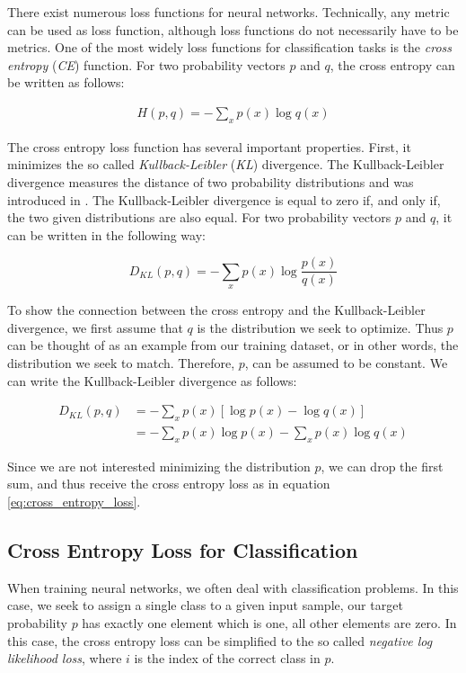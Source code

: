 There exist numerous loss functions for neural networks. Technically, any metric can be used as loss function, although loss functions do not necessarily have to be metrics. One of the most widely loss functions for classification tasks is the \textit{cross entropy} (\textit{CE}) function. For two  probability vectors $p$ and $q$, the cross entropy can be written as follows:

\begin{align}
H(p, q) = - \sum_{x} p(x) \log q(x)
\label{eq:cross_entropy_loss}
\end{align}

The cross entropy loss function has several important properties. First, it minimizes the so called \textit{Kullback-Leibler} (\textit{KL}) divergence. The Kullback-Leibler divergence measures the distance of two probability distributions and was introduced in \cite{kullback1951information}. The Kullback-Leibler divergence is equal to zero if, and only if, the two given distributions are also equal. For two probability vectors $p$ and $q$, it can be written in the following way:

\[
D_{KL}(p, q) = -\sum_{x} p(x) \log \frac{p(x)}{q(x)}
\]

To show the connection between the cross entropy and the Kullback-Leibler divergence, we first assume that $q$ is the distribution we seek to optimize. Thus $p$ can be thought of as an example from our training dataset, or in other words, the distribution we seek to match. Therefore, $p$, can be assumed to be constant. We can write the Kullback-Leibler divergence as follows: 

\begin{align*}
D_{KL}(p, q) &= - \sum_{x} p(x) \left[ \log p(x) - \log q(x) \right] \\
& = - \sum_{x} p(x) \log p(x) -\sum_{x} p(x) \log q(x)
\end{align*}

Since we are not interested minimizing the distribution $p$, we can drop the first sum, and thus receive the cross entropy loss as in equation \ref{eq:cross_entropy_loss}. 
\subsection{Cross Entropy Loss for Classification}
\label{sec:ce_loss}
When training neural networks, we often deal with classification problems. In this case, we seek to assign a single class to a given input sample, our target probability $p$ has exactly one element which is one, all other elements are zero. In this case, the cross entropy loss can be simplified to the so called \textit{negative log likelihood loss}, where $i$ is the index of the correct class in $p$. 

